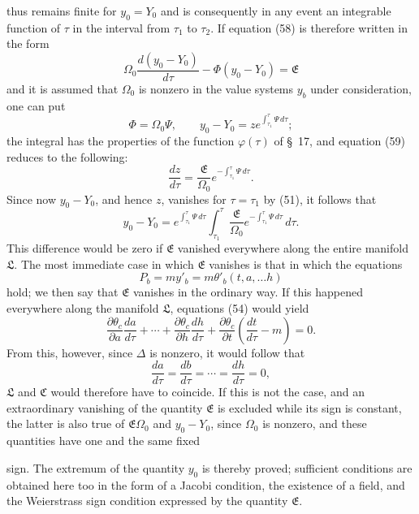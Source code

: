 \documentclass[11pt,a4paper,leqno]{article}
\begin{document}
thus remains finite for $y_0=Y_0$ and is consequently in any event an
integrable function of $\tau$ in the interval from $\tau_1$ to
$\tau_2$. If equation (58) is therefore written in the form
\begin{equation}\tag{59}
\Omega_0\frac{d(y_0-Y_0)}{d\tau}-\Phi(y_0-Y_0)=\mathfrak{E}
\end{equation}
and it is assumed that $\Omega_0$ is nonzero in the value systems $y_b$
under consideration, one can put
\[
\Phi=\Omega_0\Psi,\qquad
y_0-Y_0=z e^{\int_{\tau_1}^{\tau}\Psi\,d\tau};
\]
the integral has the properties of the function $\varphi(\tau)$ of
\S~17, and equation (59) reduces to the following:
\[
\frac{dz}{d\tau}=\frac{\mathfrak{E}}{\Omega_0}
e^{-\int_{\tau_1}^{\tau}\Psi\,d\tau}.
\]
Since now $y_0-Y_0$, and hence $z$, vanishes for $\tau=\tau_1$ by
(51), it follows that
\[
y_0-Y_0=e^{\int_{\tau_1}^{\tau}\Psi\,d\tau}
\int_{\tau_1}^{\tau}\frac{\mathfrak{E}}{\Omega_0}
e^{-\int_{\tau_1}^{\tau}\Psi\,d\tau}\,d\tau.
\]
This difference would be zero if $\mathfrak{E}$ vanished everywhere
along the entire manifold $\mathfrak{L}$. The most immediate case in
which $\mathfrak{E}$ vanishes is that in which the equations
\[
P_b=my'_b=m\theta'_b(t,a,\ldots h)
\]
hold; we then say that $\mathfrak{E}$ vanishes in the ordinary way. If
this happened everywhere along the manifold $\mathfrak{L}$, equations
(54) would yield
\[
\frac{\partial\theta_c}{\partial a}\frac{da}{d\tau}
+\cdots+
\frac{\partial\theta_c}{\partial h}\frac{dh}{d\tau}
+\frac{\partial\theta_c}{\partial t}
\left(\frac{dt}{d\tau}-m\right)=0.
\]
From this, however, since $\Delta$ is nonzero, it would follow that
\[
\frac{da}{d\tau}=\frac{db}{d\tau}=\cdots=\frac{dh}{d\tau}=0,
\]
$\mathfrak{L}$ and $\mathfrak{C}$ would therefore have to coincide. If
this is not the case, and an extraordinary vanishing of the quantity
$\mathfrak{E}$ is excluded while its sign is constant, the latter is
also true of $\mathfrak{E}\Omega_0$ and $y_0-Y_0$, since $\Omega_0$ is
nonzero, and these quantities have one and the same fixed

sign. The extremum of the quantity $y_0$ is thereby proved; sufficient
conditions are obtained here too in the form of a Jacobi condition,
the existence of a field, and the Weierstrass sign condition expressed
by the quantity $\mathfrak{E}$.
\end{document}
